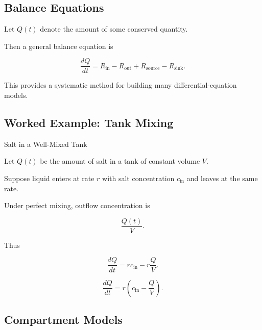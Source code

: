 \subsection{Balance Equations}
\label{subsec:balance-equations}

Let \(Q(t)\) denote the amount of some conserved quantity.

Then a general balance equation is

\[
\boxed{
\frac{dQ}{dt}
=
R_{\text{in}}
-
R_{\text{out}}
+
R_{\text{source}}
-
R_{\text{sink}}.
}
\]

This provides a systematic method for building many differential-equation
models.

\subsection{Worked Example: Tank Mixing}
\label{subsec:worked-tank-mixing}

\begin{workedexamplebox}{Salt in a Well-Mixed Tank}

Let \(Q(t)\) be the amount of salt in a tank of constant volume \(V\).

Suppose liquid enters at rate \(r\) with salt concentration \(c_{\text{in}}\)
and leaves at the same rate.

Under perfect mixing, outflow concentration is

\[
\frac{Q(t)}{V}.
\]

Thus

\[
\frac{dQ}{dt}
=
rc_{\text{in}}
-
r\frac{Q}{V}.
\]

\begin{answerbox}
\[
\boxed{
\frac{dQ}{dt}
=
r
\left(
c_{\text{in}}
-
\frac{Q}{V}
\right).
}
\]
\end{answerbox}

\end{workedexamplebox}

\subsection{Compartment Models}
\label{subsec:compartment-models}

